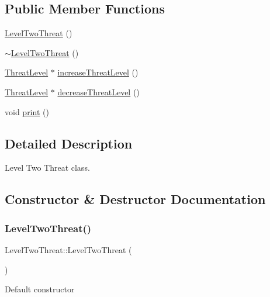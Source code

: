 \subsection*{Public Member Functions}
\begin{DoxyCompactItemize}
\item 
\hyperlink{classLevelTwoThreat_a862bf482af05fb712da3f02564653ee1}{Level\+Two\+Threat} ()
\item 
\hyperlink{classLevelTwoThreat_af07b8e6bfd18b564a83c41cae1ffb37a}{$\sim$\+Level\+Two\+Threat} ()
\item 
\hyperlink{classThreatLevel}{Threat\+Level} $\ast$ \hyperlink{classLevelTwoThreat_a54b4d396cdd27504f1a8063c04be5bcf}{increase\+Threat\+Level} ()
\item 
\hyperlink{classThreatLevel}{Threat\+Level} $\ast$ \hyperlink{classLevelTwoThreat_a1d9e88b0f43396721a2f51ae67191359}{decrease\+Threat\+Level} ()
\item 
void \hyperlink{classLevelTwoThreat_a9e21bc1a55bb25d86346c484f5fd0525}{print} ()
\end{DoxyCompactItemize}


\subsection{Detailed Description}
Level Two Threat class. 

\subsection{Constructor \& Destructor Documentation}
\mbox{\label{classLevelTwoThreat_a862bf482af05fb712da3f02564653ee1}} 
\subsubsection{\texorpdfstring{Level\+Two\+Threat()}{LevelTwoThreat()}}
{\footnotesize\ttfamily Level\+Two\+Threat\+::\+Level\+Two\+Threat (\begin{DoxyParamCaption}{ }\end{DoxyParamCaption})}

Default constructor \mbox{\label{classLevelTwoThreat_af07b8e6bfd18b564a83c41cae1ffb37a}} 
